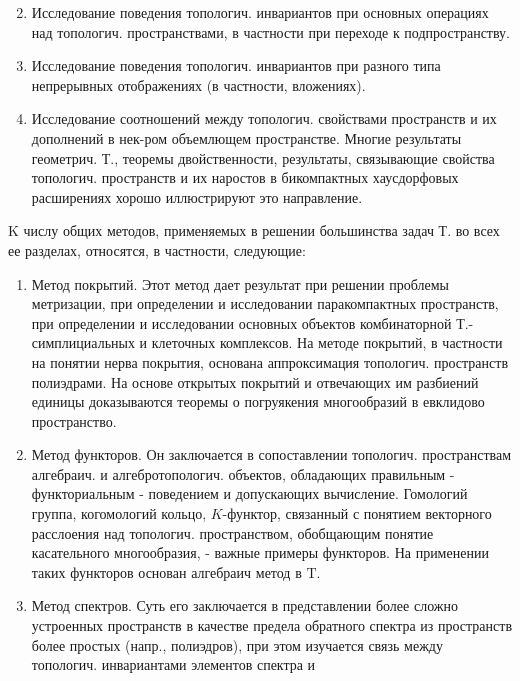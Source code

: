 \documentclass[10pt]{article}
\begin{document}
\begin{enumerate}

  \setcounter{enumi}{1}

  \item Исследование поведения топологич. инвариантов при основных операциях над топологич. пространствами, в частности при переходе к подпространству.



  \item Исследование поведения топологич. инвариантов при разного типа непрерывных отображениях (в частности, вложениях).



  \item Исследование соотношений между топологич. свойствами пространств и их дополнений в нек-ром объемлющем пространстве. Многие результаты геометрич. Т., теоремы двойственности, результаты, связывающие свойства топологич. пространств и их наростов в бикомпактных хаусдорфовых расширениях хорошо иллюстрируют это направление.



\end{enumerate}



K числу общих методов, применяемых в решении большинства задач Т. во всех ее разделах, относятся, в частности, следующие:



\begin{enumerate}

  \item Метод покрытий. Этот метод дает результат при решении проблемы метризации, при определении и исследовании паракомпактных пространств, при определении и исследовании основных объектов комбинаторной Т.- симплициальных и клеточных комплексов. На методе покрытий, в частности на понятии нерва покрытия, основана аппроксимация топологич. пространств полиэдрами. На основе открытых покрытий и отвечающих им разбиений единицы доказываются теоремы о погруякения многообразий в евклидово пространство.



  \item Метод функторов. Он заключается в сопоставлении топологич. пространствам алгебраич. и алгебротопологич. объектов, обладающих правильным - функториальным - поведением и допускающих вычисление. Гомологий группа, когомологий кольцо, $K$-функтор, связанный с понятием векторного расслоения над топологич. пространством, обобщающим понятие касательного многообразия, - важные примеры функторов. На применении таких функторов основан алгебраич метод в $\mathrm{T}$.



  \item Метод спектров. Суть его заключается в представлении более сложно устроенных пространств в качестве предела обратного спектра из пространств более простых (напр., полиэдров), при этом изучается связь между топологич. инвариантами элементов спектра и



\end{enumerate}
\end{document}
